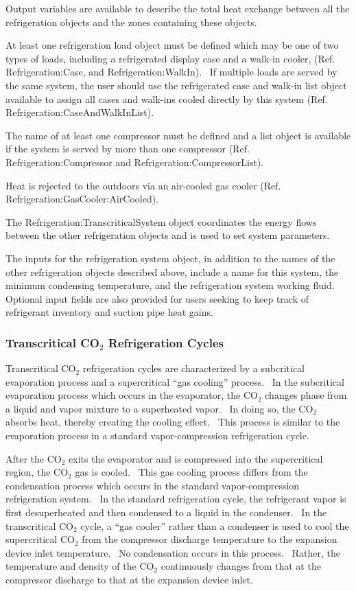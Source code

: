 Output variables are available to describe the total heat exchange between all the refrigeration objects and the zones containing these objects.

At least one refrigeration load object must be defined which may be one of two types of loads, including a refrigerated display case and a walk-in cooler, (Ref. Refrigeration:Case, and Refrigeration:WalkIn).~ If multiple loads are served by the same system, the user should use the refrigerated case and walk-in list object available to assign all cases and walk-ins cooled directly by this system (Ref. Refrigeration:CaseAndWalkInList).

The name of at least one compressor must be defined and a list object is available if the system is served by more than one compressor (Ref. Refrigeration:Compressor and Refrigeration:CompressorList).

Heat is rejected to the outdoors via an air-cooled gas cooler (Ref. Refrigeration:GasCooler:AirCooled).

The Refrigeration:TranscriticalSystem object coordinates the energy flows between the other refrigeration objects and is used to set system parameters.

The inputs for the refrigeration system object, in addition to the names of the other refrigeration objects described above, include a name for this system, the minimum condensing temperature, and the refrigeration system working fluid.~ Optional input fields are also provided for users seeking to keep track of refrigerant inventory and suction pipe heat gains.

\subsubsection{\texorpdfstring{Transcritical CO\(_{2}\) Refrigeration Cycles}{Transcritical CO\_\{2\} Refrigeration Cycles}}\label{transcritical-co2-refrigeration-cycles}

Transcritical CO\(_{2}\) refrigeration cycles are characterized by a subcritical evaporation process and a supercritical ``gas cooling'' process.~ In the subcritical evaporation process which occurs in the evaporator, the CO\(_{2}\) changes phase from a liquid and vapor mixture to a superheated vapor.~ In doing so, the CO\(_{2}\) absorbs heat, thereby creating the cooling effect.~ This process is similar to the evaporation process in a standard vapor-compression refrigeration cycle.

After the CO\(_{2}\) exits the evaporator and is compressed into the supercritical region, the CO\(_{2}\) gas is cooled.~ This gas cooling process differs from the condensation process which occurs in the standard vapor-compression refrigeration system.~ In the standard refrigeration cycle, the refrigerant vapor is first desuperheated and then condensed to a liquid in the condenser.~ In the transcritical CO\(_{2}\) cycle, a ``gas cooler'' rather than a condenser is used to cool the supercritical CO\(_{2}\) from the compressor discharge temperature to the expansion device inlet temperature.~ No condensation occurs in this process.~ Rather, the temperature and density of the CO\(_{2}\) continuously changes from that at the compressor discharge to that at the expansion device inlet.

